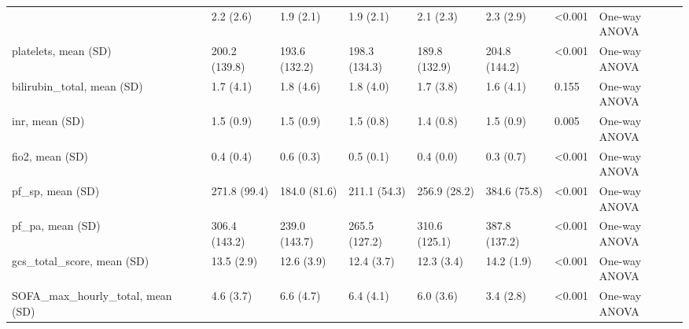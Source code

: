 \begin{tabular}{lllllllll}
{{{\cline{1-9}
creatinine, mean (SD) &  & 2.2 (2.6) & 1.9 (2.1) & 1.9 (2.1) & 2.1 (2.3) & 2.3 (2.9) & <0.001 & One-way ANOVA \\
\cline{1-9}
platelets, mean (SD) &  & 200.2 (139.8) & 193.6 (132.2) & 198.3 (134.3) & 189.8 (132.9) & 204.8 (144.2) & <0.001 & One-way ANOVA \\
\cline{1-9}
bilirubin_total, mean (SD) &  & 1.7 (4.1) & 1.8 (4.6) & 1.8 (4.0) & 1.7 (3.8) & 1.6 (4.1) & 0.155 & One-way ANOVA \\
\cline{1-9}
inr, mean (SD) &  & 1.5 (0.9) & 1.5 (0.9) & 1.5 (0.8) & 1.4 (0.8) & 1.5 (0.9) & 0.005 & One-way ANOVA \\
\cline{1-9}
fio2, mean (SD) &  & 0.4 (0.4) & 0.6 (0.3) & 0.5 (0.1) & 0.4 (0.0) & 0.3 (0.7) & <0.001 & One-way ANOVA \\
\cline{1-9}
pf_sp, mean (SD) &  & 271.8 (99.4) & 184.0 (81.6) & 211.1 (54.3) & 256.9 (28.2) & 384.6 (75.8) & <0.001 & One-way ANOVA \\
\cline{1-9}
pf_pa, mean (SD) &  & 306.4 (143.2) & 239.0 (143.7) & 265.5 (127.2) & 310.6 (125.1) & 387.8 (137.2) & <0.001 & One-way ANOVA \\
\cline{1-9}
gcs_total_score, mean (SD) &  & 13.5 (2.9) & 12.6 (3.9) & 12.4 (3.7) & 12.3 (3.4) & 14.2 (1.9) & <0.001 & One-way ANOVA \\
\cline{1-9}
SOFA_max_hourly_total, mean (SD) &  & 4.6 (3.7) & 6.6 (4.7) & 6.4 (4.1) & 6.0 (3.6) & 3.4 (2.8) & <0.001 & One-way ANOVA \\
\cline{1-9}
\bottomrule
\end{tabular}

